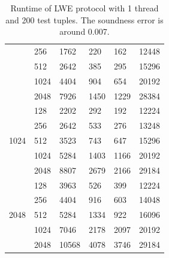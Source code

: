 \begin{table}[h!]
\begin{tabular}{|c|m{4em}|m{4em}|m{4em}|m{4em}|m{5em}|}
                                            & 256  & 1762 & 220                  & 162                    & 12448                                         \\ \cline{2-6} 
                                            & 512  & 2642 & 385                  & 295                    & 15296                                         \\ \cline{2-6} 
                                            & 1024 & 4404 & 904                  & 654                    & 20192                                         \\ \cline{2-6} 
                                            & 2048 & 7926 & 1450                 & 1229                   & 28384                                         \\ \hline
\multicolumn{1}{|l|}{\multirow{5}{*}{1024}} & 128  & 2202 & 292                  & 192                    & 12224                                         \\ \cline{2-6} 
\multicolumn{1}{|l|}{}                      & 256  & 2642 & 533                  & 276                    & 13248                                         \\ \cline{2-6} 
\multicolumn{1}{|l|}{}                      & 512  & 3523 & 743                  & 647                    & 15296                                         \\ \cline{2-6} 
\multicolumn{1}{|l|}{}                      & 1024 & 5284 & 1403                 & 1166                   & 20192                                         \\ \cline{2-6} 
\multicolumn{1}{|l|}{}                      & 2048 & 8807 & 2679                 & 2166                   & 29184                                         \\ \hline
\multicolumn{1}{|l|}{\multirow{5}{*}{2048}} & 128  & 3963 & 526                  & 399                    & 12224                                         \\ \cline{2-6} 
\multicolumn{1}{|l|}{}                      & 256  & 4404 & 916                  & 603                    & 14048                                         \\ \cline{2-6} 
\multicolumn{1}{|l|}{}                      & 512  & 5284 & 1334                 & 922                    & 16096                                         \\ \cline{2-6} 
\multicolumn{1}{|l|}{}                      & 1024 & 7046 & 2178                 & 2097                   & 20192                                         \\ \cline{2-6} 
\multicolumn{1}{|l|}{}                      & 2048 & 10568 & 4078                 & 3746                   & 29184                                         \\ \hline
\end{tabular}
\caption{Runtime of LWE protocol with 1 thread and 200 test tuples. The soundness error is around 0.007.}
\label{table:benchmark-lwe}
\end{table}



